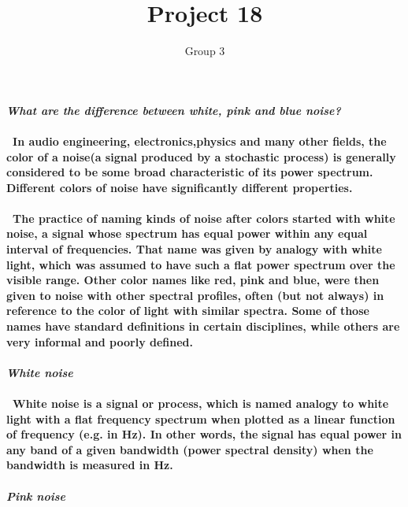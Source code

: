 \documentclass{article}
\author{Group 3}
\title{Project 18}
\begin{document}
  \maketitle
  \paragraph{\textbf{\emph{What are the difference between white, pink and blue noise?}}}
  \paragraph{  \ In audio engineering, electronics,physics and many other fields, the color of a noise(a signal produced by a stochastic process) is generally considered to be some broad characteristic of its power spectrum. Different colors of noise have significantly different properties.}
  \paragraph{ \ The practice of naming kinds of noise after colors started with white noise, a signal whose spectrum has equal power within any equal interval of frequencies. That name was given by analogy with white light, which was assumed to have such a flat power spectrum over the visible range. Other color names like red, pink and blue, were then given to noise with other spectral profiles, often (but not always) in reference to the color of light with similar spectra. Some of those names have standard definitions in certain disciplines, while others are very informal and poorly defined.}
  
  \paragraph{\textbf{\emph{White noise}}}
  \paragraph{ \ White noise is a signal or process, which is named analogy to white light with a flat frequency spectrum when plotted as a linear function of frequency (e.g. in Hz). In other words, the signal has equal power in any band of a given bandwidth (power spectral density) when the bandwidth is measured in Hz.}
  
  \paragraph{\textbf{\emph{Pink noise}}}
\end{document}
